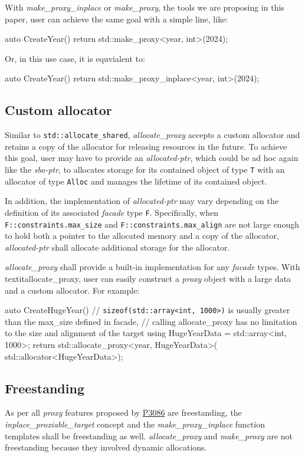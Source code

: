 \documentclass[10pt, a4paper, oneside]{article}
\begin{document}
With \textit{make\_proxy\_inplace} or \textit{make\_proxy},
the tools we are proposing in this paper,
user can achieve the same goal with a simple line, like:
\begin{codeblock}
auto CreateYear() {
  return std::make_proxy<year, int>(2024);
}
\end{codeblock}
Or, in this use case, it is equvialent to:
\begin{codeblock}
auto CreateYear() {
  return std::make_proxy_inplace<year, int>(2024);
}
\end{codeblock}

\subsection{Custom allocator}
Similar to \verb|std::allocate_shared|,
\textit{allocate\_proxy} accepts a custom allocator and retains a copy of the allocator for releasing resources in the future.
To achieve this goal,
user may have to provide an \textit{allocated-ptr},
which could be ad hoc again like the \textit{sbo-ptr},
to allocates storage for its contained object of type \verb|T| with an allocator of type \verb|Alloc| and manages the lifetime of its contained object.

In addition, the implementation of \textit{allocated-ptr} may vary depending on the definition of its associated \textit{facade} type \verb|F|.
Specifically, when \verb|F::constraints.max_size| and \verb|F::constraints.max_align| are not large enough to hold both a pointer to the allocated memory and a copy of the allocator,
\textit{allocated-ptr} shall allocate additional storage for the allocator.

\textit{allocate\_proxy} shall provide a built-in implementation for any \textit{facade} types.
With textit{allocate\_proxy}, user can easily construct a \textit{proxy} object with a large data and a custom allocator.
For example:
\begin{codeblock}
auto CreateHugeYear(){
  // \verb|sizeof(std::array<int, 1000>)| is usually greater than the max\_size defined in facade,
  // calling allocate\_proxy has no limitation to the size and alignment of the target
  using HugeYearData = std::array<int, 1000>;
  return std::allocate_proxy<year, HugeYearData>(
    std::allocator<HugeYearData>{});
}
\end{codeblock}

\subsection{Freestanding}
As per all \textit{proxy} features proposed by \href{https://wg21.link/p3086}{P3086} are freestanding,
the \textit{inplace\_proxiable\_target} concept and the \textit{make\_proxy\_inplace} function templates shall be freestanding as well.
\textit{allocate\_proxy} and \textit{make\_proxy} are not freestanding because they involved dynamic allocations.
\end{document}
